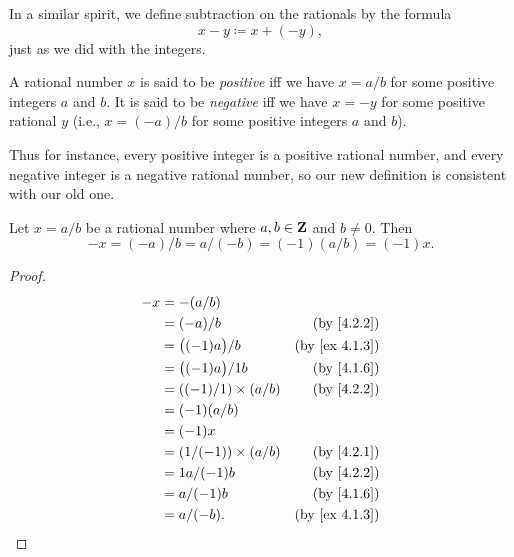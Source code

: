 \begin{note}
  In a similar spirit, we define subtraction on the rationals by the formula
  \[
    x - y \coloneqq x + (-y),
  \]
  just as we did with the integers.
\end{note}

\begin{definition}\label{4.2.6}
  A rational number \(x\) is said to be \emph{positive} iff we have \(x = a / b\) for some positive integers \(a\) and \(b\).
  It is said to be \emph{negative} iff we have \(x = -y\) for some positive rational \(y\)
  (i.e., \(x = (-a) / b\) for some positive integers \(a\) and \(b\)).
\end{definition}

\begin{note}
  Thus for instance, every positive integer is a positive rational number, and every negative integer is a negative rational number, so our new definition is consistent with our old one.
\end{note}

\begin{additional corollary}\label{ac 4.2.3}
Let \(x = a / b\) be a rational number where \(a, b \in \mathbf{Z}\) and \(b \neq 0\).
Then
\[
  -x = (-a) / b = a / (-b) = (-1)(a / b) = (-1)x.
\]
\end{additional corollary}

\begin{proof}
  \begin{align*}
    -x & = -(a / b)                                                \\
       & = (-a) / b                  & \text{(by \cref{4.2.2})}    \\
       & = \big((-1)a\big) / b       & \text{(by \cref{ex 4.1.3})} \\
       & = \big((-1)a\big) / 1b      & \text{(by \cref{4.1.6})}    \\
       & = ((-1) / 1) \times (a / b) & \text{(by \cref{4.2.2})}    \\
       & = (-1)(a / b)                                             \\
       & = (-1)x                                                   \\
       & = (1 / (-1)) \times (a / b) & \text{(by \cref{4.2.1})}    \\
       & = 1a / (-1)b                & \text{(by \cref{4.2.2})}    \\
       & = a / (-1)b                 & \text{(by \cref{4.1.6})}    \\
       & = a / (-b).                 & \text{(by \cref{ex 4.1.3})}
  \end{align*}
\end{proof}

